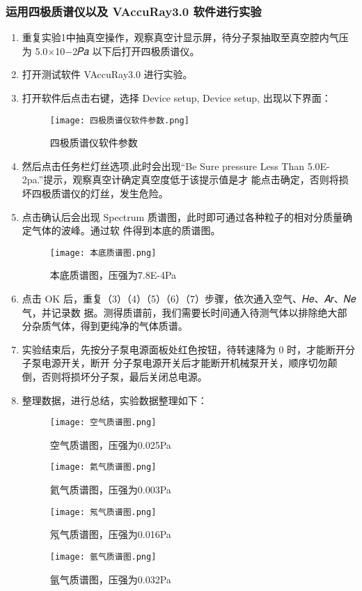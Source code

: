 \documentclass[dvipsnames, svgnames,a4paper,11pt]{article}
\begin{document}
	\subsubsection{运用四极质谱仪以及 VAccuRay3.0 软件进行实验}
	\begin{enumerate}
		\item 重复实验1中抽真空操作，观察真空计显示屏，待分子泵抽取至真空腔内气压为 5.0×10−2𝑃𝑎 以下后打开四极质谱仪。
		\item 打开测试软件 VAccuRay3.0 进行实验。 
		\item 打开软件后点击右键，选择 Device setup, Device setup, 出现以下界面：
		\begin{figure}[htbp]
			\centering
			\texttt{[image: 四极质谱仪软件参数.png]}
			\caption{四极质谱仪软件参数}
			\label{fig:四极质谱仪软件参数}
		\end{figure}
		\item 然后点击任务栏灯丝选项,此时会出现“Be Sure pressure Less Than 5.0E-2pa.”提示，观察真空计确定真空度低于该提示值是才
		能点击确定，否则将损坏四极质谱仪的灯丝，发生危险。 
		\item 点击确认后会出现 Spectrum 质谱图，此时即可通过各种粒子的相对分质量确定气体的波峰。通过软
		件得到本底的质谱图。
		\begin{figure}[htbp]
			\centering
			\texttt{[image: 本底质谱图.png]}
			\caption{本底质谱图，压强为7.8E-4Pa}
			\label{fig:本底质谱图}
		\end{figure}
		\item 点击 OK 后，重复（3）（4）（5）（6）（7）步骤，依次通入空气、𝐻𝑒、𝐴𝑟、𝑁𝑒 气，并记录数
		据。测得质谱前，我们需要长时间通入待测气体以排除绝大部分杂质气体，得到更纯净的气体质谱。 
		\item 实验结束后，先按分子泵电源面板处红色按钮，待转速降为 0 时，才能断开分子泵电源开关，断开
		分子泵电源开关后才能断开机械泵开关，顺序切勿颠倒，否则将损坏分子泵，最后关闭总电源。 
		\item 整理数据，进行总结，实验数据整理如下：
		\begin{figure}[htbp]
			\centering
			\texttt{[image: 空气质谱图.png]}
			\caption{空气质谱图，压强为0.025Pa}
			\label{fig:空气质谱图}
		\end{figure}
		
		\begin{figure}[htbp]
			\centering
			\texttt{[image: 氦气质谱图.png]}
			\caption{氦气质谱图，压强为0.003Pa}
			\label{fig:氦气质谱图}
		\end{figure}

		\begin{figure}[htbp]
			\centering
			\texttt{[image: 氖气质谱图.png]}
			\caption{氖气质谱图，压强为0.016Pa}
			\label{fig:氖气质谱图}
		\end{figure}
		
		\begin{figure}[htbp]
			\centering
			\texttt{[image: 氩气质谱图.png]}
			\caption{氩气质谱图，压强为0.032Pa}
			\label{fig:氩气质谱图}
		\end{figure}
	\end{enumerate}
\end{document}
